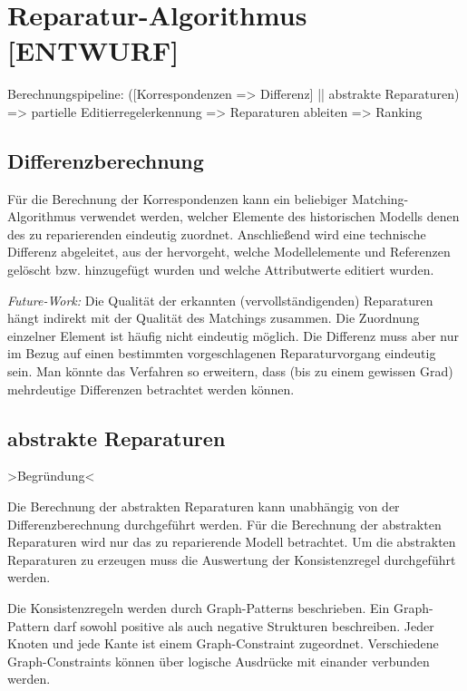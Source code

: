 \chapter{Reparatur-Algorithmus [ENTWURF]}
\label{chapter:algorithm}

Berechnungspipeline: ([Korrespondenzen => Differenz] || abstrakte Reparaturen) 
=> partielle Editierregelerkennung => Reparaturen ableiten => Ranking

\section{Differenzberechnung}

Für die Berechnung der Korrespondenzen kann ein beliebiger Matching-Algorithmus
verwendet werden, welcher Elemente des historischen Modells denen des zu
reparierenden eindeutig zuordnet. Anschließend wird eine technische Differenz
abgeleitet, aus der hervorgeht, welche Modellelemente und Referenzen gelöscht
bzw. hinzugefügt wurden und welche Attributwerte editiert wurden.

\textit{Future-Work:} Die Qualität der erkannten (vervollständigenden)
Reparaturen hängt indirekt mit der Qualität des Matchings zusammen. Die
Zuordnung einzelner Element ist häufig nicht eindeutig möglich. Die Differenz
muss aber nur im Bezug auf einen bestimmten vorgeschlagenen Reparaturvorgang
eindeutig sein. Man könnte das Verfahren so erweitern, dass (bis zu einem
gewissen Grad) mehrdeutige Differenzen betrachtet werden können.

\section{abstrakte Reparaturen}

>Begründung<

Die Berechnung der abstrakten Reparaturen kann unabhängig von der
Differenzberechnung durchgeführt werden. Für die Berechnung der abstrakten
Reparaturen wird nur das zu reparierende Modell betrachtet. Um die abstrakten
Reparaturen zu erzeugen muss die Auswertung der Konsistenzregel durchgeführt
werden. 

Die Konsistenzregeln werden durch Graph-Patterns beschrieben. Ein Graph-Pattern
darf sowohl positive als auch negative Strukturen beschreiben. Jeder Knoten und
jede Kante ist einem Graph-Constraint zugeordnet. Verschiedene Graph-Constraints
können über logische Ausdrücke mit einander verbunden werden.

